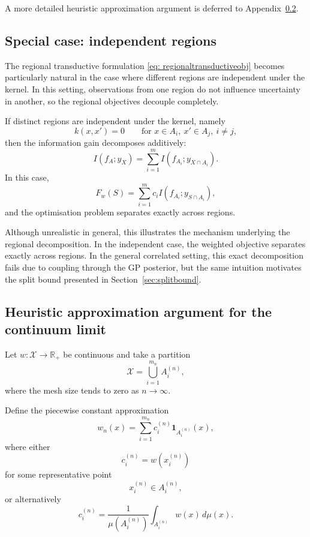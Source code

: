 A more detailed heuristic approximation argument is deferred to Appendix~\ref{appendix:continuum}.

\subsection{Special case: independent regions}
\label{app:indepregions}

The regional transductive formulation \eqref{eq: regionaltransductiveobj} becomes particularly natural in the case where different regions are independent under the kernel. In this setting, observations from one region do not influence uncertainty in another, so the regional objectives decouple completely.

If distinct regions are independent under the kernel, namely
\begin{equation*}
k(x,x')=0
\qquad
\text{for } x\in A_i,\ x'\in A_j,\ i\neq j,
\end{equation*}
then the information gain decomposes additively:
\begin{equation*}
I(f_A;y_X)
=
\sum_{i=1}^m
I(f_{A_i};y_{X\cap A_i}).
\end{equation*}
In this case,
\begin{equation*}
F_w(S)
=
\sum_{i=1}^m
c_i
I(f_{A_i};y_{S\cap A_i}),
\end{equation*}
and the optimisation problem separates exactly across regions.

Although unrealistic in general, this illustrates the mechanism underlying
the regional decomposition. In the independent case, the weighted objective
separates exactly across regions. In the general correlated setting, this
exact decomposition fails due to coupling through the GP posterior, but the
same intuition motivates the split bound presented in
Section~\ref{sec:splitbound}.

\subsection{Heuristic approximation argument for the continuum limit} \label{appendix:continuum}

Let $w:\mathcal{X}\to \mathbb{R}_+$ be continuous and take a partition
\begin{equation*}
\mathcal{X}
=
\bigcup_{i=1}^{m_n}
A_i^{(n)},
\end{equation*}
where the mesh size tends to zero as $n\to\infty$.

Define the piecewise constant approximation
\begin{equation*}
w_n(x)
=
\sum_{i=1}^{m_n}
c_i^{(n)}
\mathbf{1}_{A_i^{(n)}}(x),
\end{equation*}
where either
\begin{equation*}
c_i^{(n)}
=
w(x_i^{(n)})
\end{equation*}
for some representative point
\begin{equation*}
x_i^{(n)}\in A_i^{(n)},
\end{equation*}
or alternatively
\begin{equation*}
c_i^{(n)}
=
\frac{1}{\mu(A_i^{(n)})}
\int_{A_i^{(n)}} w(x)\,d\mu(x).
\end{equation*}

